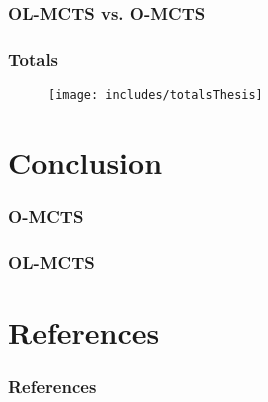 \documentclass[aspectratio=169]{beamer}
\begin{document}
\begin{frame}
	\frametitle{OL-MCTS vs. O-MCTS}
	\begin{figure}
	\centering
	\end{figure}
	\begin{figure}
	\centering
	\end{figure}
\end{frame}

\begin{frame}
	\frametitle{Totals}
	\begin{figure}
	\centering
	\texttt{[image: includes/totalsThesis]}
	\end{figure}
\end{frame}

\section{Conclusion}
\begin{frame}
	\frametitle{O-MCTS}
\end{frame}

\begin{frame}
	\frametitle{OL-MCTS}
\end{frame}

\section{References}
\begin{frame}[allowframebreaks]
	\frametitle{References}
	\tiny{ }
	
\end{frame}
\end{document}
